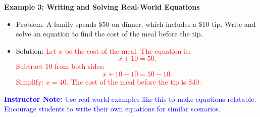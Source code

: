 \documentclass[12pt]{article}
\begin{document}
\begin{tcolorbox}[colframe=black!60, colback=white, 
coltitle=black, colbacktitle=black!15, fonttitle=\bfseries\Large, 
title=Examples (Continued) , halign title=center, left=10pt, right=10pt, top=10pt, bottom=15pt]
\textbf{Example 3: Writing and Solving Real-World Equations}
\begin{itemize}
    \item Problem: A family spends \$50 on dinner, which includes a \$10 tip. Write and solve an equation to find the cost of the meal before the tip.
    \item Solution: \textcolor{red}{Let \( x \) be the cost of the meal. The equation is:
    \[ x + 10 = 50.\]
    Subtract 10 from both sides:
    \[
    x + 10 - 10 = 50 - 10.
    \] Simplify: \( x = 40 \). The cost of the meal before the tip is \$40.}
\end{itemize}

\textcolor{blue}{\textbf{Instructor Note:} Use real-world examples like this to make equations relatable. Encourage students to write their own equations for similar scenarios.}
\end{tcolorbox}
\end{document}
